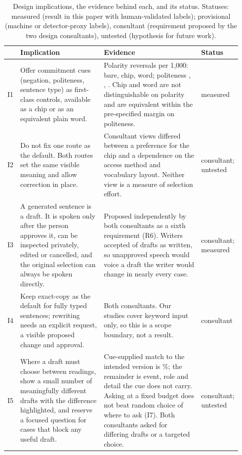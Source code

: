 \begin{table}[t]
\caption{Design implications, the evidence behind each, and its status. Statuses: measured (result in this paper with human-validated labels); provisional (machine or detector-proxy labels), consultant (requirement proposed by the two design consultants), untested (hypothesis for future work).}
\label{tab:implications}
\small
\begin{tabular}{@{}p{0.04\linewidth}p{0.36\linewidth}p{0.42\linewidth}p{0.12\linewidth}@{}}
\toprule
 & Implication & Evidence & Status \\
\midrule
I1 & Offer commitment cues (negation, politeness, sentence type) as first-class controls, available as a chip or as an equivalent plain word. & Polarity reversals per 1,000: \jmfOneRevPolBare{} bare, \jmfOneRevPolChip{} chip, \jmfOneRevPolWord{} word; politeness \jmfOneRevPoliteBare{}, \jmfOneRevPoliteChip{}, \jmfOneRevPoliteWord{}. Chip and word are not distinguishable on polarity and are equivalent within the pre-specified margin on politeness. & measured \\
I2 & Do not fix one route as the default. Both routes set the same visible meaning and allow correction in place. & Consultant views differed between a preference for the chip and a dependence on the access method and vocabulary layout. Neither view is a measure of selection effort. & consultant; untested \\
I3 & A generated sentence is a draft. It is spoken only after the person approves it, can be inspected privately, edited or cancelled, and the original selection can always be spoken directly. & Proposed independently by both consultants as a sixth requirement (R6). Writers accepted \jmpOneEightAcceptYesK{} of \jmpOneEightAcceptN{} drafts as written, so unapproved speech would voice a draft the writer would change in nearly every case. & consultant; measured \\
I4 & Keep exact-copy as the default for fully typed sentences; rewriting needs an explicit request, a visible proposed change and approval. & Both consultants. Our studies cover keyword input only, so this is a scope boundary, not a result. & consultant \\
I5 & Where a draft must choose between readings, show a small number of meaningfully different drafts with the difference highlighted, and reserve a focused question for cases that block any useful draft. & Cue-supplied match to the intended version is \jmpOneEightMatchChip{}\%; the remainder is event, role and detail the cue does not carry. Asking at a fixed budget does not beat random choice of where to ask (I7). Both consultants asked for differing drafts or a targeted choice. & consultant; untested \\

\end{tabular}
\end{table}
